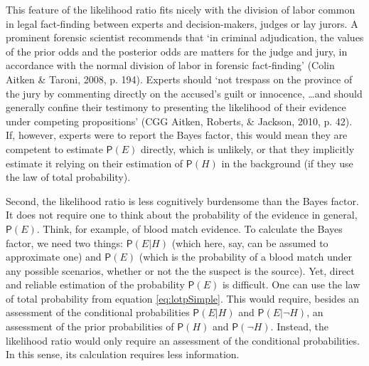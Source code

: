 \documentclass[
  10pt,
  dvipsnames,enabledeprecatedfontcommands]{scrartcl}
\newcommand{\pr}[1]{\mathsf{P}(#1)}
\begin{document}
This feature of the likelihood ratio fits nicely with the division of
labor common in legal fact-finding between experts and decision-makers,
judges or lay jurors. A prominent forensic scientist recommends that `in
criminal adjudication, the values of the prior odds and the posterior
odds are matters for the judge and jury, in accordance with the normal
division of labor in forensic fact-finding' (Colin Aitken \& Taroni,
2008, p. 194). Experts should `not trespass on the province of the jury
by commenting directly on the accused's guilt or innocence, \dots and
should generally confine their testimony to presenting the likelihood of
their evidence under competing propositions' (CGG Aitken, Roberts, \&
Jackson, 2010, p. 42). If, however, experts were to report the Bayes
factor, this would mean they are competent to estimate \(\pr{E}\)
directly, which is unlikely, or that they implicitly estimate it relying
on their estimation of \(\pr{H}\) in the background (if they use the law
of total probability).

Second, the likelihood ratio is less cognitively burdensome than the
Bayes factor. It does not require one to think about the probability of
the evidence in general, \(\pr{E}\). Think, for example, of blood match
evidence. To calculate the Bayes factor, we need two things:
\(\pr{E\vert H}\) (which here, say, can be assumed to approximate one)
and \(\pr{E}\) (which is the probability of a blood match under any
possible scenarios, whether or not the the suspect is the source). Yet,
direct and reliable estimation of the probability \(\pr{E}\) is
difficult. One can use the law of total probability from equation
\eqref{eq:lotpSimple}. This would require, besides an assessment of the
conditional probabilities \(\pr{E\vert H}\) and \(\pr{E\vert \neg H}\),
an assessment of the prior probabilities of \(\pr{H}\) and
\(\pr{\neg H}\). Instead, the likelihood ratio would only require an
assessment of the conditional probabilities. In this sense, its
calculation requires less information.
\end{document}

